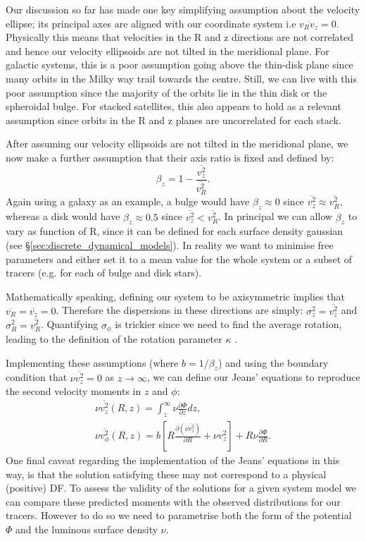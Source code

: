 Our discussion so far has made one key simplifying assumption about the velocity ellipse; its principal axes are aligned with our coordinate system i.e $\overline{v_R v_z} = 0$. Physically this means that velocities in the R and z directions are not correlated and hence our velocity ellipsoids are not tilted in the meridional plane. For galactic systems, this is a poor assumption going above the thin-disk plane since many orbits in the Milky way trail towards the centre. Still, we can live with this poor assumption since the majority of the orbits lie in the thin disk or the spheroidal bulge. For stacked satellites, this also appears to hold as a relevant assumption since orbits in the R and z planes are uncorrelated for each stack.

After assuming our velocity ellipsoids are not tilted in the meridional plane, we now make a further assumption that their axis ratio is fixed and defined by:
\begin{equation} \label{beta_z}
\beta_z = 1 - \frac{\overline{v_{z}^2}}{\overline{v_{R}^2}}.
\end{equation}
Again using a galaxy as an example, a bulge would have $\beta_z \approx 0$ since $\overline{v_z^2} \approx \overline{v_R^2}$, whereas a disk would have $\beta_z \approx 0.5$ since $\overline{v_z^2} < \overline{v_R^2}$. In principal we can allow $\beta_z$ to vary as function of R, since it can be defined for each surface density gaussian (see \S\ref{sec:discrete_dynamical_models}). In reality we want to minimise free parameters and either set it to a mean value for the whole system or a subset of tracers (e.g. for each of bulge and disk stars). 

Mathematically speaking, defining our system to be axisymmetric implies that $\overline{v_{R}} = \overline{v_{z}} = 0$. Therefore the dispersions in these directions are simply: $\sigma_{z}^2 = \overline{v_z^2}$ and $\sigma_{R}^2 = \overline{v_R^2}$. Quantifying $\sigma_{\phi}$ is trickier since we need to find the average rotation, leading to the definition of the rotation parameter $\kappa$ \citep[e.g. Equation 22 in][]{watkins2013}. 

Implementing these assumptions (where $b = 1/\beta_z$) and using the boundary condition that $\nu \overline{v_z^2} = 0$ as $z \to \infty$, we can define our Jeans' equations to reproduce the second velocity moments in $z$ and $\phi$:
\begin{eqnarray} \label{jeans1}
\nu \overline{v_z^2}(R,z) = \int^{\infty}_{z} \nu \frac{\partial \Phi}{\partial z} dz, \\
\nu \overline{v_{\phi}^2}(R,z) = b \left[ R \frac{\partial (\nu \overline{v_z^2})}{\partial R} + \nu v_{z}^2\right] + R\nu \frac{\partial \Phi}{\partial R} . \label{jeans2}
\end{eqnarray}
One final caveat regarding the implementation of the Jeans' equations in this way, is that the solution satisfying these may not correspond to a physical (positive) DF. To assess the validity of the solutions for a given system model we can compare these predicted moments with the observed distributions for our tracers. However to do so we need to parametrise both the form of the potential $\Phi$ and the luminous surface density $\nu$.

